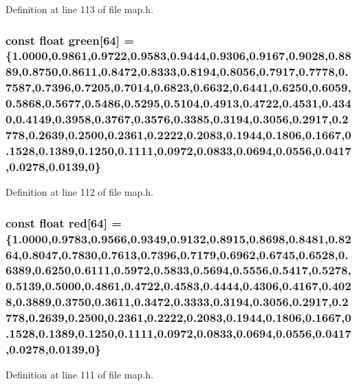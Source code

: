 Definition at line 113 of file map.h.

\subsubsection[{green}]{\setlength{\rightskip}{0pt plus 5cm}const float {\bf green}[64] = \{1.0000,0.9861,0.9722,0.9583,0.9444,0.9306,0.9167,0.9028,0.8889,0.8750,0.8611,0.8472,0.8333,0.8194,0.8056,0.7917,0.7778,0.7587,0.7396,0.7205,0.7014,0.6823,0.6632,0.6441,0.6250,0.6059,0.5868,0.5677,0.5486,0.5295,0.5104,0.4913,0.4722,0.4531,0.4340,0.4149,0.3958,0.3767,0.3576,0.3385,0.3194,0.3056,0.2917,0.2778,0.2639,0.2500,0.2361,0.2222,0.2083,0.1944,0.1806,0.1667,0.1528,0.1389,0.1250,0.1111,0.0972,0.0833,0.0694,0.0556,0.0417,0.0278,0.0139,0\}\hspace{0.3cm}{\ttfamily  [static]}}\label{map_8h_a540851e576db993bc651f251fab01028}


Definition at line 112 of file map.h.

\subsubsection[{red}]{\setlength{\rightskip}{0pt plus 5cm}const float {\bf red}[64] = \{1.0000,0.9783,0.9566,0.9349,0.9132,0.8915,0.8698,0.8481,0.8264,0.8047,0.7830,0.7613,0.7396,0.7179,0.6962,0.6745,0.6528,0.6389,0.6250,0.6111,0.5972,0.5833,0.5694,0.5556,0.5417,0.5278,0.5139,0.5000,0.4861,0.4722,0.4583,0.4444,0.4306,0.4167,0.4028,0.3889,0.3750,0.3611,0.3472,0.3333,0.3194,0.3056,0.2917,0.2778,0.2639,0.2500,0.2361,0.2222,0.2083,0.1944,0.1806,0.1667,0.1528,0.1389,0.1250,0.1111,0.0972,0.0833,0.0694,0.0556,0.0417,0.0278,0.0139,0\}\hspace{0.3cm}{\ttfamily  [static]}}\label{map_8h_a7aa1e993dd4e98d7f56db1534eb6c462}


Definition at line 111 of file map.h.


